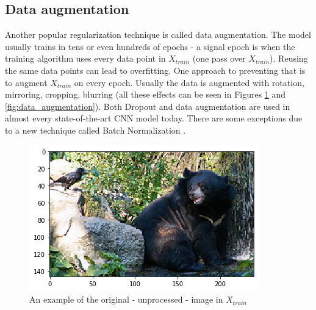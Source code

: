 \documentclass[times, utf8, diplomski]{fer}
\begin{document}
\subsection{Data augmentation}  \label{se:data_augmentation}

Another popular regularization technique is called data augmentation. The model usually trains in tens or even hundreds of epochs - a signal epoch is when the training algorithm uses every data point in $X_{train}$ (one pass over $X_{train}$). Reusing the same data points can lead to overfitting. One approach to preventing that is to augment $X_{train}$ on every epoch. Usually the data is augmented with rotation, mirroring, cropping, blurring (all these effects can be seen in Figures \ref{fig:data_augmentation_figure} and \ref{fig:data_augmentation}). Both Dropout and data augmentation are used in almost every state-of-the-art CNN model today. There are some exceptions due to a new technique called Batch Normalization \citep{ioffe_batch_2015}.

\begin{figure}
  \includegraphics[scale=0.7]{figures/data_augmentation.png}
  \centering
  \caption{An example of the original - unprocessed - image in $X_{train}$}
  \label{fig:data_augmentation_figure}
\end{figure}
\end{document}
